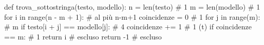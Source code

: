 \begin{unipdcode}[language=Python]
def trova_sottostringa(testo, modello):
    n = len(testo)                              # 1
    m = len(modello)                            # 1
    for i in range(n - m + 1):                  # al più n-m+1
        coincidenze = 0                         # 1
        for j in range(m):                      # m
            if testo[i + j] == modello[j]:      # 4
                coincidenze += 1                # 1 (t)
        if coincidenze == m:                    # 1
            return i                            # escluso
    return -1                                   # escluso
\end{unipdcode}
